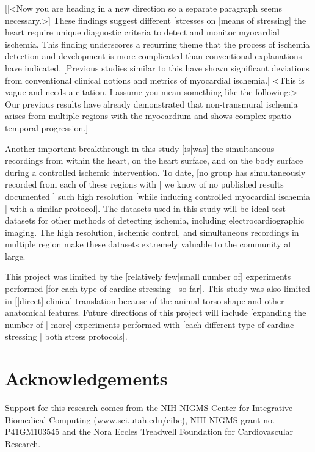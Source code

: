 \documentclass[twocolumn]{cinc}
\begin{document}
[|<Now you are heading in a new direction so a separate paragraph seems
necessary.>] These findings suggest different [stresses on |means of
stressing] the heart require unique diagnostic criteria to detect and
monitor myocardial ischemia. This finding underscores a recurring theme
that the process of ischemia detection and development is more complicated
than conventional explanations have indicated. [Previous studies similar to
this have shown significant deviations from conventional clinical notions
and metrics of myocardial ischemia.| <This is vague and needs a citation.
I assume you mean something like the following:> Our previous results have
already demonstrated that non-transmural ischemia arises from multiple
regions with the myocardium and shows complex spatio-temporal
progression.\cite{}]

Another important breakthrough in this study [is|was] the simultaneous
recordings from within the heart, on the heart surface, and on the body
surface during a controlled ischemic intervention. To date, [no group has
simultaneously recorded from each of these regions with | we know of no
published results documented ] such high resolution [while inducing
controlled myocardial ischemia | with a similar protocol]. The datasets used
in this study will be ideal test datasets for other methods of detecting
ischemia, including electrocardiographic imaging. The high resolution,
ischemic control, and simultaneous recordings in multiple region make these
datasets extremely valuable to the community at large.

This project was limited by the [relatively few|small number of]
experiments performed [for each type of cardiac stressing | so far]. This
study was also limited in [|direct] clinical translation because of the
animal torso shape and other anatomical features. Future directions of this
project will include [expanding the number of | more] experiments performed
with [each different type of cardiac stressing | both stress protocols].


\balance


\section*{Acknowledgements}  
% 
Support for this research comes from the NIH NIGMS Center for Integrative
Biomedical Computing (www.sci.utah.edu/cibc), NIH NIGMS grant
no. P41GM103545 and the Nora Eccles Treadwell Foundation for Cardiovascular
Research.
\end{document}
